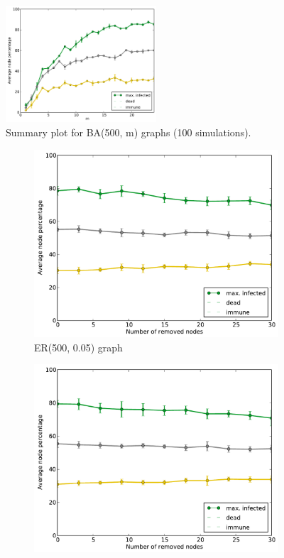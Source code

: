 \documentclass[11pt]{article} %
\begin{document}
\begin{figure}
  \centering
  \includegraphics[width=0.5\textwidth]{figures/sum_BA_500_m}
  \caption{Summary plot for BA(500, m) graphs (100 simulations).}
  \label{fig:ba_sum}
\end{figure}

\begin{figure}[tb]
  \begin{subfigure}[b]{0.5\textwidth}
    \centering
    \includegraphics[width=\textwidth]{figures/hubs_ER_500_005}
    \caption{ER(500, 0.05) graph}
  \end{subfigure}
  \begin{subfigure}[b]{0.5\textwidth}
    \centering
    \includegraphics[width=\textwidth]{figures/hubs_WS_500_29_01}

\end{subfigure}
\end{figure}
\end{document}
